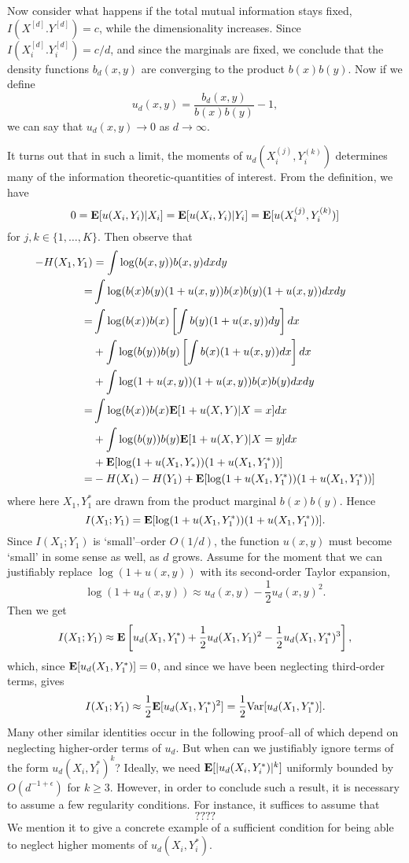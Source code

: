 \documentclass[12pt]{article}
\begin{document}
Now consider what happens if the total mutual information stays fixed,
$I(X^{[d]}. Y^{[d]}) = c$, while the dimensionality increases.  Since
$I(X_i^{[d]}. Y_i^{[d]}) = c/d$, and since the marginals are fixed,
we conclude that the density functions $b_d(x, y)$ are converging
to the product $b(x) b(y)$.  Now if we define
\[
u_d(x, y) = \frac{b_d(x, y)}{b(x) b(y)} - 1,
\]
we can say that $u_d(x, y) \to 0$ as $d \to \infty$.

It turns out that in such a limit, the moments of $u_d(X_i^{(j)},
Y_i^{(k)})$ determines many of the information theoretic-quantities of
interest.  From the definition, we have 
\[
0 = \textbf{E}[u(X_i, Y_i)|X_i] = \textbf{E}[u(X_i, Y_i)|Y_i] = \textbf{E}[u(X_i^{(j)}, Y_i^{(k)})]
\]
for $j, k \in \{1,\hdots, K\}$.
Then observe that
\begin{align*}
-H(X_1, Y_1) &= \int \log(b(x, y)) b(x,y) dx dy
\\=& \int \log (b(x)b(y)(1 + u(x, y)) b(x) b(y) (1 + u(x, y)) dx dy
\\=& \int \log(b(x)) b(x) \left[\int b(y) (1 + u(x, y)) dy\right]dx 
\\&+ \int \log(b(y)) b(y) \left[\int b(x) (1 + u(x, y)) dx\right]dx 
\\&+ \int \log(1 + u(x, y)) (1 + u(x, y)) b(x) b(y) dx dy
\\=& \int \log(b(x)) b(x) \textbf{E}[1 + u(X, Y)|X = x] dx 
\\&+ \int \log(b(y)) b(y) \textbf{E}[1 + u(X, Y)|X = y] dx 
\\&+ \textbf{E}[\log(1 + u(X_1, Y_*))(1 + u(X_1, Y_1^*))]
\\=& -H(X_1) - H(Y_1) + \textbf{E}[\log(1 + u(X_1, Y_1^*))(1 + u(X_1, Y_1^*))]
\end{align*}
where here $X_1, Y_1^*$ are drawn from the product marginal $b(x)b(y)$.
Hence
\[
I(X_1; Y_1) = \textbf{E}[\log(1 + u(X_1, Y_1^*))(1 + u(X_1, Y_1^*))].
\]
Since $I(X_1; Y_1)$ is `small'--order $O(1/d)$, the function $u(x,y)$
must become `small' in some sense as well, as $d$ grows.  Assume for
the moment that we can justifiably replace $\log(1 + u(x,y))$ with its
second-order Taylor expansion,
\[
\log(1 + u_d(x,y)) \approx u_d(x,y) - \frac{1}{2}u_d(x, y)^2.
\]
Then we get
\[
I(X_1; Y_1) \approx \textbf{E}\left[u_d(X_1,Y_1^*) + \frac{1}{2}u_d(X_1,Y_1)^2 - \frac{1}{2}u_d(X_1,Y_1^*)^3\right],
\]
which, since $\textbf{E}[u_d(X_1,Y_1^*)] = 0$, and since we have been neglecting third-order terms,
gives
\[
I(X_1;Y_1) \approx \frac{1}{2}\textbf{E}[u_d(X_1,Y_1^*)^2] = \frac{1}{2}\text{Var}[u_d(X_1,Y_1^*)].
\]
Many other similar identities occur in the following proof--all of
which depend on neglecting higher-order terms of $u_d$.  But when can
we justifiably ignore terms of the form $u_d(X_i, Y_i^*)^k$?  Ideally,
we need $\textbf{E}[|u_d(X_i, Y_i^*)|^k]$ uniformly bounded by $O(d^{-1
+ \epsilon})$ for $k \geq 3$.  However, in
order to conclude such a result, it is necessary to assume a few
regularity conditions.  For instance, it suffices to assume that
\[
????
\]
We mention it to give a concrete example of a sufficient condition
for being able to neglect higher moments of $u_d(X_i, Y_i^*)$.
\end{document}
